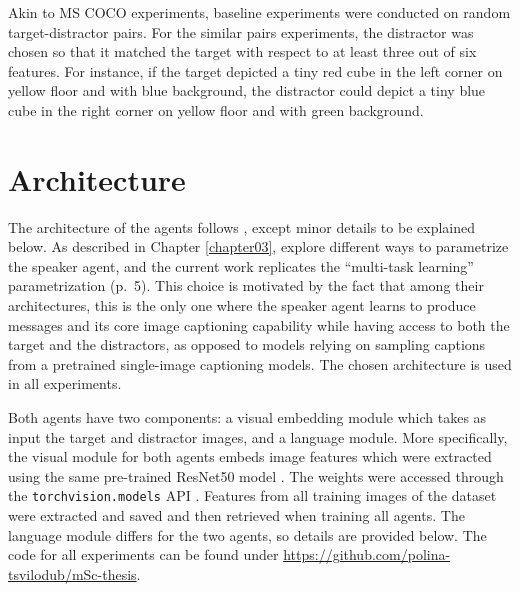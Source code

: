 Akin to MS COCO experiments, baseline experiments were conducted on random target-distractor pairs. For the similar pairs experiments, the distractor was chosen so that it matched the target with respect to at least three out of six features. For instance, if the target depicted a tiny red cube in the left corner on yellow floor and with blue background, the distractor could depict a tiny blue cube in the right corner on yellow floor and with green background.



\section{Architecture}
\label{architecture}
The architecture of the agents follows \textcite{lazaridou2020multi}, except minor details to be explained below. As described in Chapter \ref{chapter03}, \textcite{lazaridou2020multi} explore different ways to parametrize the speaker agent, and the current work replicates the ``multi-task learning'' parametrization (p.~5). This choice is motivated by the fact that among their architectures, this is the only one where the speaker agent learns to produce messages and its core image captioning capability while having access to both the target and the distractors, as opposed to models relying on sampling captions from a pretrained single-image captioning models. The chosen architecture is used in all experiments.

Both agents have two components: a visual embedding module which takes as input the target and distractor images, and a language module. More specifically, the visual module for both agents embeds image features which were extracted using the same pre-trained ResNet50 model \parencite{he2016deep}. The weights were accessed through the \texttt{torchvision.models} API \parencite{marcel2010torchvision}. Features from all training images of the dataset were extracted and saved and then retrieved when training all agents. 
The language module differs for the two agents, so details are provided below. 
The code for all experiments can be found under \url{https://github.com/polina-tsvilodub/mSc-thesis}. 

